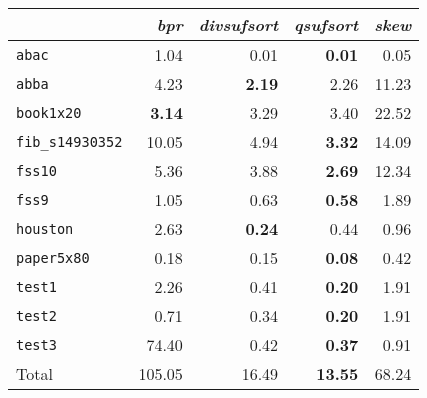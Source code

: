 \begin{tabular}{l r r r r } \toprule
 & \emph{bpr} & \emph{divsufsort} & \emph{qsufsort} & \emph{skew}\\ \midrule
\texttt{abac} & 1.04 & 0.01 & \textbf{0.01} & 0.05\\
\texttt{abba} & 4.23 & \textbf{2.19} & 2.26 & 11.23\\
\texttt{book1x20} & \textbf{3.14} & 3.29 & 3.40 & 22.52\\
\texttt{fib\_s14930352} & 10.05 & 4.94 & \textbf{3.32} & 14.09\\
\texttt{fss10} & 5.36 & 3.88 & \textbf{2.69} & 12.34\\
\texttt{fss9} & 1.05 & 0.63 & \textbf{0.58} & 1.89\\
\texttt{houston} & 2.63 & \textbf{0.24} & 0.44 & 0.96\\
\texttt{paper5x80} & 0.18 & 0.15 & \textbf{0.08} & 0.42\\
\texttt{test1} & 2.26 & 0.41 & \textbf{0.20} & 1.91\\
\texttt{test2} & 0.71 & 0.34 & \textbf{0.20} & 1.91\\
\texttt{test3} & 74.40 & 0.42 & \textbf{0.37} & 0.91\\
 \midrule
Total & 105.05 & 16.49 & \textbf{13.55} & 68.24\\
 \bottomrule
\end{tabular}
